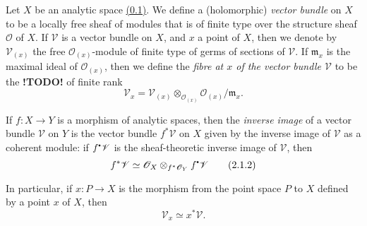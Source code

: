 \documentclass{report}
\theoremstyle{plain}
\theoremstyle{definition}
\newenvironment{env}[1]
    {\renewcommand\theinnercustomenv{#1}\innercustomenv}
    {\endinnercustomenv}
\newcommand{\sh}[1]{{\mathscr{#1}}}
\newcommand{\sbullet}{{\mathbin{\vcenter{\hbox{\scalebox{.5}{$\bullet$}}}}}}
\newcommand{\todo}{\textbf{ !TODO! }}
\begin{document}
\begin{env}{2.1}
  Let $X$ be an analytic space \hyperref[0.1]{(0.1)}.
  We define a (holomorphic) \emph{vector bundle} on $X$ to be a locally free sheaf of modules that is of finite type over the structure sheaf $\sh{O}$ of $X$.
  If $\sh{V}$ is a vector bundle on $X$, and $x$ a point of $X$, then we denote by $\sh{V}_{(x)}$ the free $\sh{O}_{(x)}$-module of finite type of germs of sections of $\sh{V}$.
  If $\mathfrak{m}_x$ is the maximal ideal of $\sh{O}_{(x)}$, then we define the \emph{fibre at $x$ of the vector bundle $\sh{V}$} to be the \todo of finite rank
  \[
  \label{I.2.1.1}
    \sh{V}_x = \sh{V}_{(x)} \otimes_{\sh{O}_{(x)}} \sh{O}_{(x)}/\mathfrak{m}_x.
  \tag{2.1.1}
  \]

  If $f\colon X\to Y$ is a morphism of analytic spaces, then the \emph{inverse image} of a vector bundle $\sh{V}$ on $Y$ is the vector bundle $f^*\sh{V}$ on $X$ given by the inverse image of $\sh{V}$ as a coherent module:
  if $f^\sbullet\sh{V}$ is the sheaf-theoretic inverse image of $\sh{V}$, then
  \[
  \label{I.2.1.2}
    f^*\sh{V} \simeq \sh{O}_X \otimes_{f^*\sh{O}_Y} f^\sbullet\sh{V}
  \tag{2.1.2}
  \]

  In particular, if $x\colon P\to X$ is the morphism from the point space $P$ to $X$ defined by a point $x$ of $X$, then
  \[
    \label{I.2.1.3}
      \sh{V}_x \simeq x^*\sh{V}.
    \tag{2.1.3}
  \]
\end{env}
\end{document}
